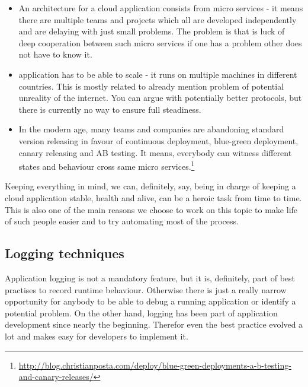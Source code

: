 \begin{itemize}
    \item An architecture for a cloud application consists from micro services - it means there are multiple teams and projects which all are developed independently and are delaying with just small problems. The problem is that  is luck of deep cooperation between such micro services if one has a problem other does not have to know it.
    \item {} application has to be able to scale - it runs on multiple machines in different countries. This is mostly related to already mention problem of potential unreality of the internet. You can argue with potentially better protocols, but there is currently no way to ensure full steadiness.
    \item In the modern age, many teams and companies are abandoning standard version releasing in favour of continuous deployment, blue-green deployment, canary releasing and AB testing. It means, everybody can witness different states and behaviour cross same micro services.\footnote{\url{http://blog.christianposta.com/deploy/blue-green-deployments-a-b-testing-and-canary-releases/}}
\end{itemize}
Keeping everything in mind, we can, definitely, say, being in charge of keeping a cloud application stable, health and alive, can be a heroic task from time to time. This is also one of the main reasons we choose to work on this topic to make life of such people easier and to try automating most of the process. 

\subsection{Logging techniques}
\label{ssec:sota_logging_logging}

Application logging is not a mandatory feature, but it is, definitely, part of best practises to record runtime behaviour. Otherwise there is just a really narrow opportunity for anybody to be able to debug a running application or identify a potential problem. On the other hand, logging has been part of application development since nearly the beginning. Therefor even the best practice evolved a lot and  makes  easy for developers to implement it. 

